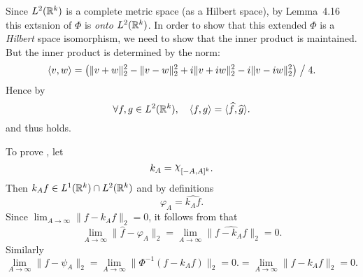 \begin{enumerate}
\begin{thmproof}
Since \(L^2(\mathbb{R}^k)\) is a complete metric space (as a Hilbert space),
by Lemma~4.16 this extsnion of \(\Phi\) is \emph{onto}
\(L^2(\mathbb{R}^k)\).
In order to show that this extended \(\Phi\) is a
\emph{Hilbert} space isomorphism, we need to show that 
the inner product is maintained. But the inner product is determined
by the norm:
\begin{equation*}
\langle v,w\rangle = 
\left(
\|v+w\|_2^2
- \|v-w\|_2^2
+ i\|v+iw\|_2^2
- i\|v-iw\|_2^2
\right) \bigm/ 4.
\end{equation*}
Hence by  
\begin{equation*}
\forall f,g\in L^2(\mathbb{R}^k),\quad 
\langle f,g\rangle = \langle \widehat{f},\widehat{g}\rangle.
\end{equation*}
and thus  holds.

To prove , let 
\begin{equation*}
k_A = \chhi_{[-A,A]^k}.
\end{equation*}
Then \(k_Af \in L^1(\mathbb{R}^k)\cap L^2(\mathbb{R}^k)\) and by definitions
\begin{equation*}
\varphi_A = \widehat{k_A f}.
\end{equation*}
Since \(\lim_{A\to\infty} \|f - k_A f\|_2 = 0\), 
it follows from  that 
\begin{equation*}
\lim_{A\to\infty} \|\widehat{f} - \varphi_A\|_2
= \lim_{A\to\infty} \|\widehat{f - k_A f}\|_2 = 0.
\end{equation*}
Similarly 
\begin{equation*}
\lim_{A\to\infty} \|f - \psi_A\|_2
= \lim_{A\to\infty} \|\Phi^{-1}(f - k_A f)\|_2 = 0.
= \lim_{A\to\infty} \|f - k_A f\|_2 = 0.
\end{equation*}
\end{thmproof}


\end{enumerate}

